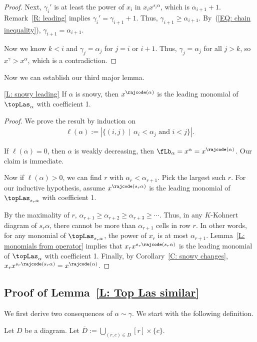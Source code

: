 \begin{proof}
Next, 
$\gamma_{i}'$ is at least
the power of $x_{i}$ in $x_ix^{s_i \alpha}$,
which is $\alpha_{i+1} + 1$.
Remark~\ref{R: leading} implies $\gamma_i' = \gamma_{i+1} + 1$.
Thus, $\gamma_{i+1} \geqslant \alpha_{i+1}$.
By~(\ref{EQ: chain inequality}), $\gamma_{i+1} = \alpha_{i+1}$.

Now we know $k < i$
and $\gamma_j = \alpha_j$ for $j = i$ or $i+1$.
Thus, $\gamma_j = \alpha_j$ for all $j > k$,
so~$x^\gamma > x^\alpha$, which is a contradiction. 
\end{proof}

Now we can establish our third major lemma. 
\begin{manuallemma}{\ref{L: snowy leading}}
If $\alpha$ is snowy, 
then $x^{\rajcode(\alpha)}$ is the leading monomial of 
$\topLas_\alpha$ with coefficient 1.
\end{manuallemma}
\begin{proof}
We prove the result by induction on 
\begin{align*}
\ell(\alpha) := |\{(i,j) \mid\, \alpha_i < \alpha_j \text{ and } i < j\}|.
\end{align*}

If $\ell(\alpha)=0$, then $\alpha$ is weakly decreasing, 
then $\fLb_\alpha = 
x^\alpha = x^{\rajcode(\alpha)}$.
Our claim is immediate. 

Now if $\ell(\alpha) > 0$,
we can find $r$ with $\alpha_r < \alpha_{r+1}$.
Pick the largest such $r$.
For our inductive hypothesis,
assume $x^{\rajcode(s_r \alpha)}$ is the leading monomial 
of $\topLas_{s_r \alpha}$ with coefficient 1.

By the maximality of $r$, 
$\alpha_{r+1} \geqslant \alpha_{r+2} 
\geqslant \alpha_{r+3} \geqslant \cdots$.
Thus, in any $K$-Kohnert diagram of $s_r \alpha$,
there cannot be more than $\alpha_{r+1}$ cells
in row $r$.
In other words, 
for any monomial of $\topLas_{s_r \alpha}$,
the power of $x_r$ is at most $\alpha_{r+1}$.
Lemma~\ref{L: monomials from operator} implies that $x_r x^{s_r \rajcode(s_r \alpha)}$
is the leading monomial of $\topLas_{\alpha}$ with coefficient 1. 
Finally, by Corollary~\ref{C: snowy changes},
$x_r x^{s_r \rajcode(s_r \alpha)} = x^{\rajcode(\alpha)}$.
\end{proof}


\subsection{Proof of Lemma~\ref{L: Top Las similar}}
\label{SS: last major lemma}
We first derive two consequences 
of $\alpha \sim \gamma$.
We start with the following definition.
\begin{defn}
Let $D$ be a diagram.
Let $\overline{D} := \bigcup_{(r,c) \in D} [r] \times \{c\}$.
\end{defn}

